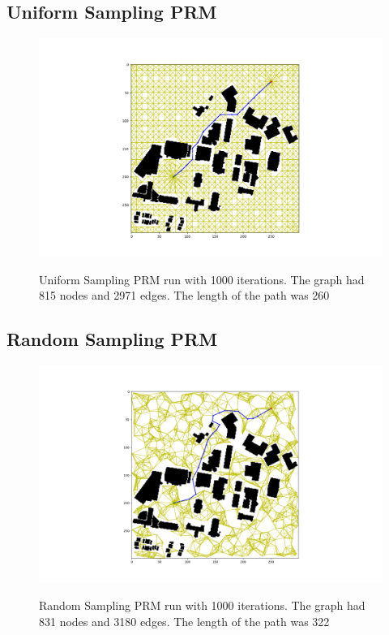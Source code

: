 \documentclass[journal]{IEEEtran}
\begin{document}
    \subsection{Uniform Sampling PRM}
    \begin{figure}[H]
        \includegraphics[width=\linewidth]{figures/UniformPRM.png}
        \label{fig:UniformPRM}
        \caption{Uniform Sampling PRM run with 1000 iterations. The graph had 815 nodes and 2971 edges. The length of the path was 260}
    \end{figure} 



    \subsection{Random Sampling PRM}
    \begin{figure}[H]
        \includegraphics[width=\linewidth]{figures/RandomPRM.png}
        \label{fig:RandomPRM}
        \caption{Random Sampling PRM run with 1000 iterations. The graph had 831 nodes and 3180 edges. The length of the path was 322}
    \end{figure} 
\end{document}
